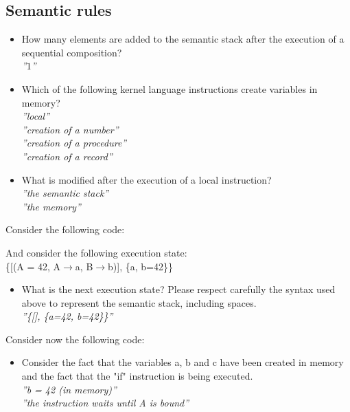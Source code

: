 \documentclass[fr,license=none]{../../../eplsummary}
\begin{document}
		\subsection{Semantic rules}
			\begin{itemize}
				\item How many elements are added to the semantic stack after the execution of a sequential composition?\\
					\textit{''$1$''}
				\item Which of the following kernel language instructions create variables in memory?\\
					\textit{''local''}\\
					\textit{''creation of a number''}\\
					\textit{''creation of a procedure''}\\
					\textit{''creation of a record''}
				\item What is modified after the execution of a local instruction?\\
					\textit{''the semantic stack''}\\
					\textit{''the memory''}
			\end{itemize}
			Consider the following code:
			
			And consider the following execution state:\\
			\{[(A = 42, {A$\rightarrow$a, B$\rightarrow$b})], \{a, b=42\}\}
			\begin{itemize}
				\item What is the next execution state? Please respect carefully the syntax used above to represent the semantic stack, including spaces.\\
					\textit{''\{[], \{a=42, b=42\}\}''}
			\end{itemize}
			Consider now the following code:
			
			\begin{itemize}
				\item Consider the fact that the variables a, b and c have been created in memory and the fact that the "if" instruction is being executed.\\
					\textit{''b = 42 (in memory)''}\\
					\textit{''the instruction waits until A is bound''}
			\end{itemize}
\end{document}

